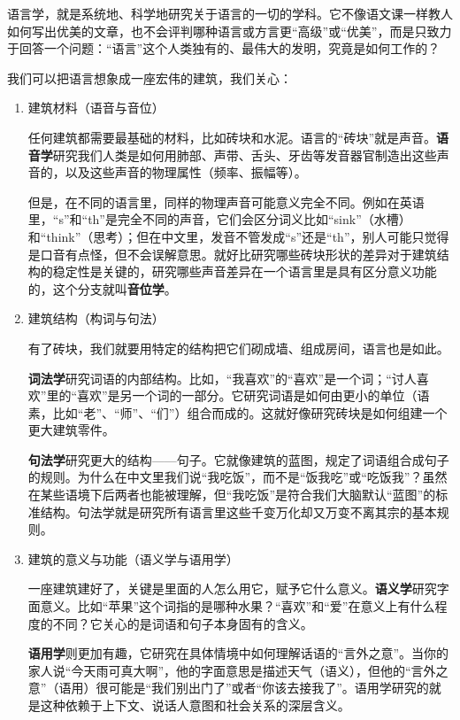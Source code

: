 \documentclass[10pt]{ctexart}
\begin{document}
语言学，就是系统地、科学地研究关于语言的一切的学科。它不像语文课一样教人如何写出优美的文章，也不会评判哪种语言或方言更``高级''或``优美''，而是只致力于回答一个问题：``语言''这个人类独有的、最伟大的发明，究竟是如何工作的？

我们可以把语言想象成一座宏伟的建筑，我们关心：

\begin{enumerate}
    \item 建筑材料（语音与音位）
    
    任何建筑都需要最基础的材料，比如砖块和水泥。语言的``砖块''就是声音。\textbf{语音学}研究我们人类是如何用肺部、声带、舌头、牙齿等发音器官制造出这些声音的，以及这些声音的物理属性（频率、振幅等）。
    
    但是，在不同的语言里，同样的物理声音可能意义完全不同。例如在英语里，``s''和``th''是完全不同的声音，它们会区分词义比如``sink''（水槽）和``think''（思考）；但在中文里，发音不管发成``s''还是``th''，别人可能只觉得是口音有点怪，但不会误解意思。就好比研究哪些砖块形状的差异对于建筑结构的稳定性是关键的，研究哪些声音差异在一个语言里是具有区分意义功能的，这个分支就叫\textbf{音位学}。

    \item 建筑结构（构词与句法）

    有了砖块，我们就要用特定的结构把它们砌成墙、组成房间，语言也是如此。
    
    \textbf{词法学}研究词语的内部结构。比如，``我喜欢''的``喜欢''是一个词；``讨人喜欢''里的``喜欢''是另一个词的一部分。它研究词语是如何由更小的单位（语素，比如``老''、``师''、``们''）组合而成的。这就好像研究砖块是如何组建一个更大建筑零件。
    
    \textbf{句法学}研究更大的结构——句子。它就像建筑的蓝图，规定了词语组合成句子的规则。为什么在中文里我们说``我吃饭''，而不是``饭我吃''或``吃饭我''？虽然在某些语境下后两者也能被理解，但``我吃饭''是符合我们大脑默认``蓝图''的标准结构。句法学就是研究所有语言里这些千变万化却又万变不离其宗的基本规则。

    \item 建筑的意义与功能（语义学与语用学）
    
    一座建筑建好了，关键是里面的人怎么用它，赋予它什么意义。\textbf{语义学}研究字面意义。比如``苹果''这个词指的是哪种水果？``喜欢''和``爱''在意义上有什么程度的不同？它关心的是词语和句子本身固有的含义。
    
    \textbf{语用学}则更加有趣，它研究在具体情境中如何理解话语的``言外之意''。当你的家人说``今天雨可真大啊''，他的字面意思是描述天气（语义），但他的``言外之意''（语用）很可能是``我们别出门了''或者``你该去接我了''。语用学研究的就是这种依赖于上下文、说话人意图和社会关系的深层含义。
\end{enumerate}
\end{document}
